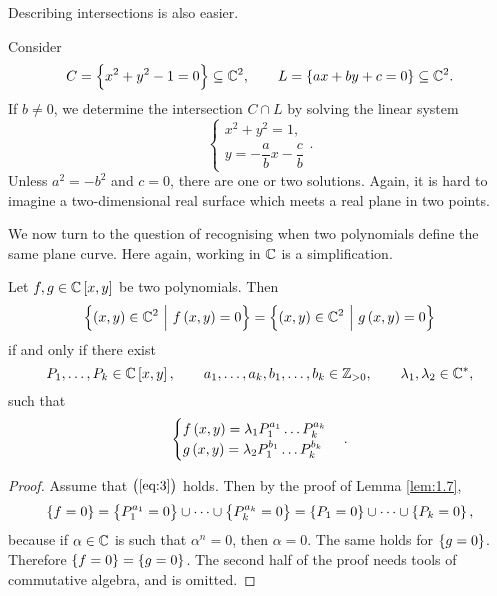 Describing intersections is also easier.

\begin{example}
Consider
$$ C = \cbr{x^2 + y^2 - 1 = 0} \subseteq \CC^2, \qquad L = \cbr{ax + by + c = 0} \subseteq \CC^2. $$
If $ b \ne 0 $, we determine the intersection $ C \cap L $ by solving the linear system
$$
\begin{cases}
x^2 + y^2 = 1, \\
y = -\dfrac{a}{b}x - \dfrac{c}{b}
\end{cases}.
$$
Unless $ a^2 = -b^2 $ and $ c = 0 $, there are one or two solutions. Again, it is hard to imagine a two-dimensional real surface which meets a real plane in two points.
\end{example}

\pagebreak

We now turn to the question of recognising when two polynomials define the same plane curve. Here again, working in $ \mathbb{C} $ is a simplification.

\begin{theorem}
\label{thm:2.10}
Let $ f, g \in \CC\sbr{x, y} $ be two polynomials. Then
$$ \cbr{\br{x, y} \in \CC^2 \st f\br{x, y} = 0} = \cbr{\br{x, y} \in \CC^2 \st g\br{x, y} = 0} $$
if and only if there exist
$$ P_1, \dots, P_k \in \CC\sbr{x, y}, \qquad a_1, \dots, a_k, b_1, \dots, b_k \in \ZZ_{> 0}, \qquad \lambda_1, \lambda_2 \in \CC^*, $$
such that
\begin{equation}
\label{eq:3}
\begin{cases}
f\br{x, y} = \lambda_1 P_1^{a_1} \dots P_k^{a_k} \\
g\br{x, y} = \lambda_2 P_1^{b_1} \dots P_k^{b_k}
\end{cases}.
\end{equation}
\end{theorem}


\begin{proof}
Assume that $ \br{\ref{eq:3}} $ holds. Then by the proof of Lemma \ref{lem:1.7},
$$ \cbr{f = 0} = \cbr{P_1^{a_1} = 0} \cup \dots \cup \cbr{P_k^{a_k} = 0} = \cbr{P_1 = 0} \cup \dots \cup \cbr{P_k = 0}, $$
because if $ \alpha \in \mathbb{C} $ is such that $ \alpha^n = 0 $, then $ \alpha = 0 $. The same holds for $ \cbr{g = 0} $. Therefore $ \cbr{f = 0} = \cbr{g = 0} $. The second half of the proof needs tools of commutative algebra, and is omitted.
\end{proof}

